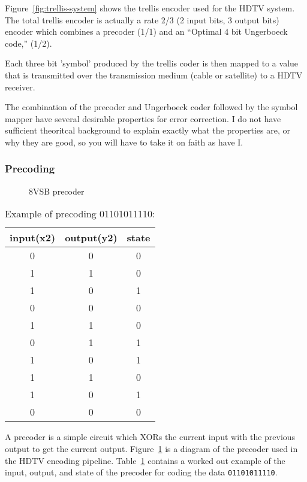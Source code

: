 \documentclass{article}
\begin{document}
Figure~\ref{fig:trellis-system} shows the trellis encoder used for the HDTV system. 
The total trellis encoder is actually a rate 2/3 (2 input bits, 3 output bits) 
encoder which combines a precoder (1/1) and an ``Optimal 4 bit 
Ungerboeck code,'' (1/2).

Each three bit 'symbol' produced by the trellis coder is then mapped to a value
that is transmitted over the transmission medium (cable or satellite) to 
a HDTV receiver. 

The combination of the precoder and Ungerboeck coder followed by the symbol mapper
have several desirable properties for error correction. I do not have sufficient
theoritcal background to explain exactly what the properties are, or why they are good,
so you will have to take it on faith as have I.


\subsubsection{Precoding}
\begin{figure}
\center
\epsfxsize=3.5in
\caption{8VSB precoder}
\label{fig:precoder}
\end{figure}

\begin{table}
\center
\begin{tabular}{c|c|c}
input(x2) & output(y2) & state  \\
\hline
0 & 0 & 0 \\
1 & 1 & 0 \\
1 & 0 & 1 \\
0 & 0 & 0 \\
1 & 1 & 0 \\
0 & 1 & 1 \\
1 & 0 & 1 \\
1 & 1 & 0 \\
1 & 0 & 1 \\
0 & 0 & 0 \\
\end{tabular}
\caption{Example of precoding 01101011110:}
\label{tbl:precoding_example}
\end{table}

A precoder is a simple circuit which XORs the current input with the previous
output to get the current output. Figure~\ref{fig:precoder} is a diagram of the
precoder used in the HDTV encoding pipeline. Table~\ref{tbl:precoding_example} 
contains a worked out example of the input, output, and state of the precoder
for coding the data \texttt{01101011110}.
\end{document}
